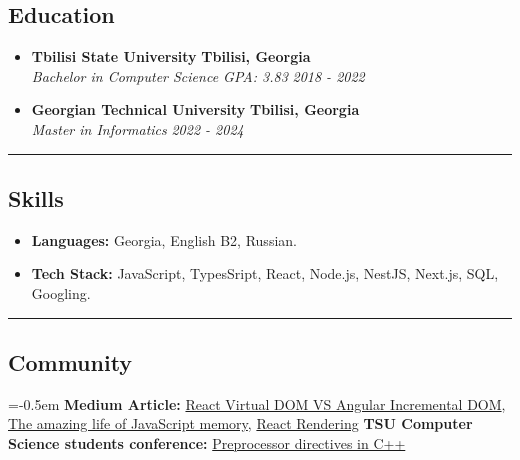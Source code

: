 \documentclass[10pt,letterpaper]{article}
\begin{document}
\subsection*{Education}
  \begin{itemize}
    \parskip=1em
      \vspace{0.05em}

    \item[]
    {\textbf{Tbilisi State University}}
     \hfill
     \textbf{Tbilisi, Georgia}
    \\
    {\emph{Bachelor in Computer Science GPA: 3.83}
     \hfill
     \emph{2018 - 2022}}

    \item[]
    {\textbf{Georgian Technical University}}
     \hfill
     \textbf{Tbilisi, Georgia}
    \\
    {\emph{Master in Informatics}
     \hfill
     \emph{2022 - 2024}}
  \end{itemize}

\hrule
\vspace{-1.0em}
\subsection*{Skills}
\begin{itemize}
  \parskip=-0.5em
  \vspace{0.05em}
  \item[] \textbf{Languages:} Georgia, English B2, Russian.
  \vspace{0.5em}
  \item[] \textbf{Tech Stack:} JavaScript, TypesSript, React, Node.js, NestJS, Next.js, SQL, Googling.
\end{itemize}

\hrule
\vspace{-1.0em}
\subsection*{Community}
\begin{itemize}
  \parskip=-0.5em
  \vspace{0.05em}
  \newline \textbf {Medium Article:} \href {https://medium.com/@giorgi-dogadze/%E1%83%A0%E1%83%90-%E1%83%90%E1%83%A0%E1%83%98%E1%83%A1-react-virtual-dom-%E1%83%93%E1%83%90-angular-incremental-dom-dec1488d5393} {React Virtual DOM VS Angular Incremental DOM}{, } \href {https://medium.com/@giorgi-dogadze/the-amazing-life-of-javascript-memory-%E1%83%90%E1%83%9C%E1%83%A3-%E1%83%A2%E1%83%98%E1%83%90%E1%83%9C%E1%83%A8%E1%83%90%E1%83%9C%E1%83%98-9183e20b6cfd} {The amazing life of JavaScript memory}{, } \href {https://medium.com/@giorgi-dogadze/react-rendering-%E1%83%98%E1%83%A1-%E1%83%A1%E1%83%90%E1%83%98%E1%83%93%E1%83%A3%E1%83%9B%E1%83%9A%E1%83%9D%E1%83%94%E1%83%91%E1%83%90%E1%83%9C%E1%83%98-6406b3ae67b9} {React Rendering}
  \vspace{0.05em}
  \newline \textbf {TSU Computer Science students conference:} \href {https://computing.tsu.ge/ka/news/15} {Preprocessor directives in C++}
  
\end{itemize}
\end{document}
